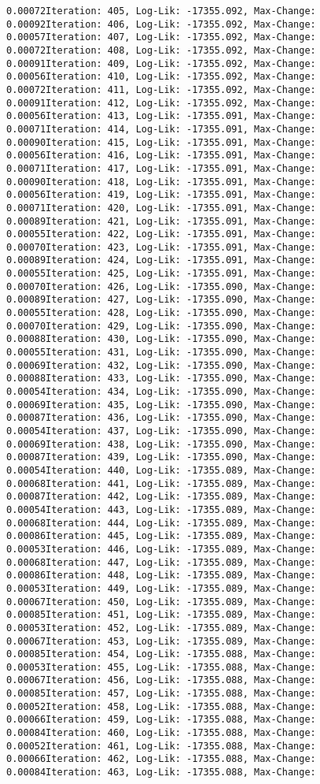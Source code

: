 \documentclass[
]{article}
\begin{document}
\begin{verbatim}
0.00072Iteration: 405, Log-Lik: -17355.092, Max-Change: 0.00092Iteration: 406, Log-Lik: -17355.092, Max-Change: 0.00057Iteration: 407, Log-Lik: -17355.092, Max-Change: 0.00072Iteration: 408, Log-Lik: -17355.092, Max-Change: 0.00091Iteration: 409, Log-Lik: -17355.092, Max-Change: 0.00056Iteration: 410, Log-Lik: -17355.092, Max-Change: 0.00072Iteration: 411, Log-Lik: -17355.092, Max-Change: 0.00091Iteration: 412, Log-Lik: -17355.092, Max-Change: 0.00056Iteration: 413, Log-Lik: -17355.091, Max-Change: 0.00071Iteration: 414, Log-Lik: -17355.091, Max-Change: 0.00090Iteration: 415, Log-Lik: -17355.091, Max-Change: 0.00056Iteration: 416, Log-Lik: -17355.091, Max-Change: 0.00071Iteration: 417, Log-Lik: -17355.091, Max-Change: 0.00090Iteration: 418, Log-Lik: -17355.091, Max-Change: 0.00056Iteration: 419, Log-Lik: -17355.091, Max-Change: 0.00071Iteration: 420, Log-Lik: -17355.091, Max-Change: 0.00089Iteration: 421, Log-Lik: -17355.091, Max-Change: 0.00055Iteration: 422, Log-Lik: -17355.091, Max-Change: 0.00070Iteration: 423, Log-Lik: -17355.091, Max-Change: 0.00089Iteration: 424, Log-Lik: -17355.091, Max-Change: 0.00055Iteration: 425, Log-Lik: -17355.091, Max-Change: 0.00070Iteration: 426, Log-Lik: -17355.090, Max-Change: 0.00089Iteration: 427, Log-Lik: -17355.090, Max-Change: 0.00055Iteration: 428, Log-Lik: -17355.090, Max-Change: 0.00070Iteration: 429, Log-Lik: -17355.090, Max-Change: 0.00088Iteration: 430, Log-Lik: -17355.090, Max-Change: 0.00055Iteration: 431, Log-Lik: -17355.090, Max-Change: 0.00069Iteration: 432, Log-Lik: -17355.090, Max-Change: 0.00088Iteration: 433, Log-Lik: -17355.090, Max-Change: 0.00054Iteration: 434, Log-Lik: -17355.090, Max-Change: 0.00069Iteration: 435, Log-Lik: -17355.090, Max-Change: 0.00087Iteration: 436, Log-Lik: -17355.090, Max-Change: 0.00054Iteration: 437, Log-Lik: -17355.090, Max-Change: 0.00069Iteration: 438, Log-Lik: -17355.090, Max-Change: 0.00087Iteration: 439, Log-Lik: -17355.090, Max-Change: 0.00054Iteration: 440, Log-Lik: -17355.089, Max-Change: 0.00068Iteration: 441, Log-Lik: -17355.089, Max-Change: 0.00087Iteration: 442, Log-Lik: -17355.089, Max-Change: 0.00054Iteration: 443, Log-Lik: -17355.089, Max-Change: 0.00068Iteration: 444, Log-Lik: -17355.089, Max-Change: 0.00086Iteration: 445, Log-Lik: -17355.089, Max-Change: 0.00053Iteration: 446, Log-Lik: -17355.089, Max-Change: 0.00068Iteration: 447, Log-Lik: -17355.089, Max-Change: 0.00086Iteration: 448, Log-Lik: -17355.089, Max-Change: 0.00053Iteration: 449, Log-Lik: -17355.089, Max-Change: 0.00067Iteration: 450, Log-Lik: -17355.089, Max-Change: 0.00085Iteration: 451, Log-Lik: -17355.089, Max-Change: 0.00053Iteration: 452, Log-Lik: -17355.089, Max-Change: 0.00067Iteration: 453, Log-Lik: -17355.089, Max-Change: 0.00085Iteration: 454, Log-Lik: -17355.088, Max-Change: 0.00053Iteration: 455, Log-Lik: -17355.088, Max-Change: 0.00067Iteration: 456, Log-Lik: -17355.088, Max-Change: 0.00085Iteration: 457, Log-Lik: -17355.088, Max-Change: 0.00052Iteration: 458, Log-Lik: -17355.088, Max-Change: 0.00066Iteration: 459, Log-Lik: -17355.088, Max-Change: 0.00084Iteration: 460, Log-Lik: -17355.088, Max-Change: 0.00052Iteration: 461, Log-Lik: -17355.088, Max-Change: 0.00066Iteration: 462, Log-Lik: -17355.088, Max-Change: 0.00084Iteration: 463, Log-Lik: -17355.088, Max-Change: 
\end{verbatim}
\end{document}

